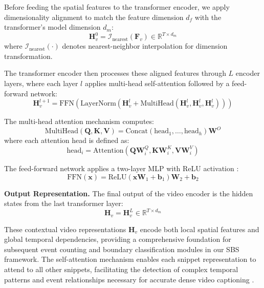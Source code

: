 Before feeding the spatial features to the transformer encoder, we apply dimensionality alignment to match the feature dimension $d_f$ with the transformer's model dimension $d_m$:
\begin{equation}
  \mathbf{H}_v^0 = \mathcal{I}_{\text{nearest}} \left( \mathbf{F}_v \right) \in \mathbb{R}^{T \times d_m}
  \label{eq:dimension_alignment}
\end{equation}
where $\mathcal{I}_{\text{nearest}}(\cdot)$ denotes nearest-neighbor interpolation for dimension transformation.

The transformer encoder then processes these aligned features through $L$ encoder layers, where each layer $l$ applies multi-head self-attention followed by a feed-forward network:
\begin{equation}
  \mathbf{H}_v^{l+1} = \text{FFN}\left(\text{LayerNorm} \left(\mathbf{H}_v^l + \text{MultiHead}\left( \mathbf{H}_v^l, \mathbf{H}_v^l, \mathbf{H}_v^l \right) \right)\right)
  \label{eq:transformer_layer}
\end{equation}

The multi-head attention mechanism computes:
\begin{equation}
  \text{MultiHead}(\mathbf{Q}, \mathbf{K}, \mathbf{V}) = \text{Concat}(\text{head}_1, \ldots, \text{head}_h) \mathbf{W}^O
  \label{eq:multihead_attention}
\end{equation}
where each attention head is defined as:
\begin{equation}
  \text{head}_i = \text{Attention}(\mathbf{Q}\mathbf{W}_i^Q, \mathbf{K}\mathbf{W}_i^K, \mathbf{V}\mathbf{W}_i^V)
  \label{eq:attention_head}
\end{equation}

The feed-forward network applies a two-layer MLP with ReLU activation \cite{He2016-qc}:
\begin{equation}
  \text{FFN}(\mathbf{x}) = \text{ReLU} \left(\mathbf{x}\mathbf{W}_1 + \mathbf{b}_1 \right)\mathbf{W}_2 + \mathbf{b}_2
  \label{eq:feed_forward_network}
\end{equation}

\textbf{Output Representation.}
The final output of the video encoder is the hidden states from the last transformer layer:
\begin{equation}
  \mathbf{H}_v = \mathbf{H}_v^L \in \mathbb{R}^{T \times d_m}
  \label{eq:final_video_representation}
\end{equation}

These contextual video representations $\mathbf{H}_v$ encode both local spatial features and global temporal dependencies, providing a comprehensive foundation for subsequent event counting and boundary classification modules in our SBS framework. The self-attention mechanism enables each snippet representation to attend to all other snippets, facilitating the detection of complex temporal patterns and event relationships necessary for accurate dense video captioning \cite{Zhou2018-zu,Wang2021-zi}.


